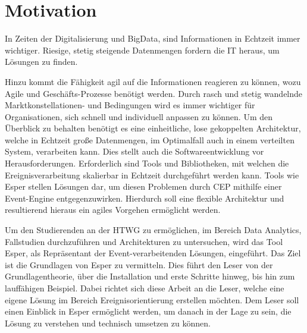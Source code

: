 \chapter{Motivation}
In Zeiten der Digitalisierung und BigData, sind Informationen in Echtzeit immer wichtiger.
Riesige, stetig steigende Datenmengen fordern die IT heraus, um Lösungen zu finden.
 
Hinzu kommt die Fähigkeit agil auf die Informationen reagieren zu können, wozu Agile und Geschäfts-Prozesse benötigt werden. 
Durch rasch und stetig wandelnde Marktkonstellationen- und Bedingungen wird es immer wichtiger für Organisationen, sich schnell und individuell anpassen zu können. Um den Überblick zu behalten benötigt es eine einheitliche, lose gekoppelten Architektur, welche in Echtzeit große Datenmengen, im Optimalfall auch in einem verteilten System, verarbeiten kann. Dies stellt auch die Softwareentwicklung vor Herausforderungen.
Erforderlich sind Tools und Bibliotheken, mit welchen die Ereignisverarbeitung skalierbar in Echtzeit durchgeführt werden kann. Tools wie Esper stellen Lösungen dar, um diesen Problemen durch CEP mithilfe einer Event-Engine entgegenzuwirken. Hierdurch soll eine flexible Architektur und resultierend hieraus ein agiles Vorgehen ermöglicht werden.

Um den Studierenden an der HTWG zu ermöglichen, im Bereich Data Analytics, Fallstudien durchzuführen und Architekturen zu untersuchen, wird das Tool Esper, als Repräsentant der Event-verarbeitenden Lösungen, eingeführt.
Das Ziel ist die Grundlagen von Esper zu vermitteln. Dies führt den Leser von der Grundlagentheorie, über die Installation und erste Schritte hinweg, bis hin zum lauffähigen Beispiel.
Dabei richtet sich diese Arbeit an die Leser, welche eine eigene Lösung im Bereich Ereignisorientierung erstellen möchten.
Dem Leser soll einen Einblick in Esper ermöglicht werden, um danach in der Lage zu sein, die Lösung zu verstehen und technisch umsetzen zu können.